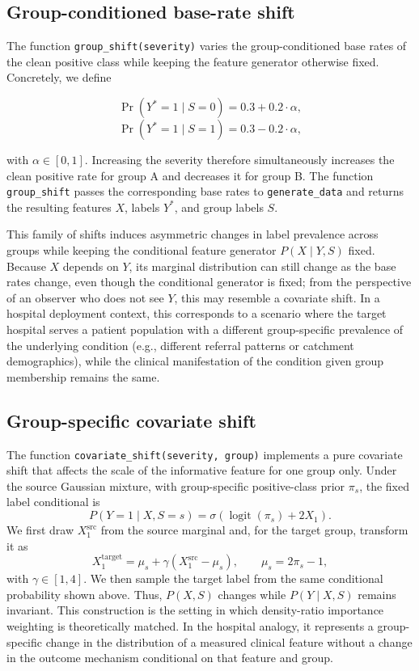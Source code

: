 \documentclass[11pt, letterpaper]{article}
\begin{document}
\subsection{Group-conditioned base-rate shift}

The function \texttt{group\_shift(severity)} varies the group-conditioned base rates of the clean positive class while keeping the feature generator otherwise fixed. Concretely, we define

\[
    \Pr(Y^*=1 \mid S=0) = 0.3 + 0.2 \cdot \alpha,
\]
\[
    \Pr(Y^*=1 \mid S=1) = 0.3 - 0.2 \cdot \alpha,
\]

with \(\alpha \in [0,1]\). Increasing the severity therefore simultaneously increases the clean positive rate for group A and decreases it for group B. The function \texttt{group\_shift} passes the corresponding base rates to \texttt{generate\_data} and returns the resulting features \(X\), labels \(Y^*\), and group labels \(S\).

This family of shifts induces asymmetric changes in label prevalence across groups while keeping the conditional feature generator \(P(X\mid Y,S)\) fixed. Because \(X\) depends on \(Y\), its marginal distribution can still change as the base rates change, even though the conditional generator is fixed; from the perspective of an observer who does not see \(Y\), this may resemble a covariate shift. In a hospital deployment context, this corresponds to a scenario where the target hospital serves a patient population with a different group-specific prevalence of the underlying condition (e.g., different referral patterns or catchment demographics), while the clinical manifestation of the condition given group membership remains the same.

\subsection{Group-specific covariate shift}

The function \texttt{covariate\_shift(severity, group)} implements a pure covariate shift that affects the scale of the informative feature for one group only. Under the source Gaussian mixture, with group-specific positive-class prior $\pi_s$, the fixed label conditional is
\[
P(Y=1\mid X,S=s)=\sigma\!\left(\operatorname{logit}(\pi_s)+2X_1\right).
\]
We first draw $X_1^{\mathrm{src}}$ from the source marginal and, for the target group, transform it as
\[
X_1^{\mathrm{target}}=\mu_s+\gamma(X_1^{\mathrm{src}}-\mu_s),
\qquad \mu_s=2\pi_s-1,
\]
with $\gamma\in[1,4]$. We then sample the target label from the same conditional probability shown above. Thus, $P(X,S)$ changes while $P(Y\mid X,S)$ remains invariant. This construction is the setting in which density-ratio importance weighting is theoretically matched. In the hospital analogy, it represents a group-specific change in the distribution of a measured clinical feature without a change in the outcome mechanism conditional on that feature and group.
\end{document}
